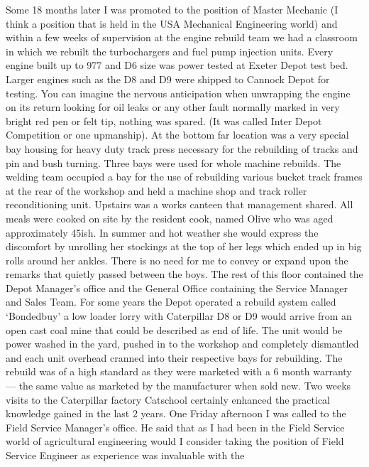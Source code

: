 
Some 18 months later I was promoted to the position of Master Mechanic (I think
a position that is held in the USA Mechanical Engineering world) and within a
few weeks of supervision at the engine rebuild team we had a classroom in which
we rebuilt the turbochargers and fuel pump injection units.  Every engine built
up to 977 and D6 size was power tested at Exeter Depot test bed.  Larger
engines such as the D8 and D9 were shipped to Cannock Depot for testing.  You
can imagine the nervous anticipation when unwrapping the engine on its return
looking for oil leaks or any other fault normally marked in very bright red pen
or felt tip, nothing was spared.  (It was called Inter Depot Competition or one
upmanship).  At the bottom far location was a very special bay housing for
heavy duty track press necessary for the rebuilding of tracks and pin and bush
turning.  Three bays were used for whole machine rebuilds.  The welding team
occupied a bay for the use of rebuilding various bucket track frames at the
rear of the workshop and held a machine shop and track roller reconditioning
unit.  Upstairs was a works canteen that management shared.  All meals were
cooked on site by the resident cook, named Olive who was aged approximately
45ish.  In summer and hot weather she would express the discomfort by unrolling
her stockings at the top of her legs which ended up in big rolls around her
ankles.  There is no need for me to convey or expand upon the remarks that
quietly passed between the boys. The rest of this floor contained the Depot
Manager's office and the General Office containing the Service Manager and
Sales Team.  For some years the Depot operated a rebuild system
called ‘Bondedbuy' a low loader lorry with Caterpillar D8 or D9 would arrive
from an open cast coal mine that could be described as end of life.  The unit
would be power washed in the yard, pushed in to the workshop and completely
dismantled and each unit overhead cranned into their respective bays for
rebuilding.  The rebuild was of a high standard as they were marketed with a 6
month warranty --- the same value as marketed by the manufacturer when sold new.
Two weeks visits to the Caterpillar factory Catschool certainly enhanced the
practical knowledge gained in the last 2 years. One Friday afternoon I was
called to the Field Service Manager's office.  He said that as I had been in
the Field Service world of agricultural engineering would I consider taking the
position of Field Service Engineer as experience was invaluable with the

